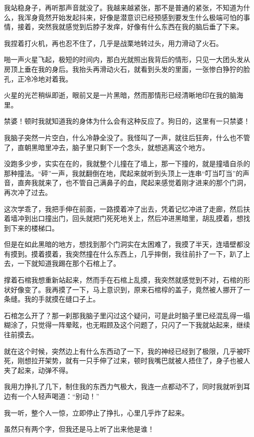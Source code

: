 我站稳身子，再听那声音就没了。我越来越紧张，那不是普通的紧张，不知道为什么，我浑身竟然开始发起抖来，好像是潜意识已经预感到要发生什么极端可怕的事情，接着，突然我就感觉到后脖子发痒，好像有什么东西在我的脑后垂了下来。

我捏着打火机，再也忍不住了，几乎是战栗地转过头，用力滑动了火石。

啪一声火星飞起，极短的时间内，那白光就照出我背后的情形，只见一大团头发从房顶上垂在我的身后。我抬头再滑动火石，就看到头发的里面，一张惨白狰狞的脸孔，正冷冷地对着我。

火星的光芒稍纵即逝，眼前又是一片黑暗，然而那情形已经清晰地印在我的脑海里。

禁婆！顿时我就知道我的身体为什么会有这种反应了。狗日的，这里有一只禁婆！

我脑子突然一片空白，什么冷静全没了。我怪叫了一声，就往后狂奔，什么也不管了，直朝黑暗里冲去，脑子里只剩下一个念头，就想逃离这个地方。

没跑多少步，实实在在的，我就整个儿撞在了墙上，那一下撞的，就是撞墙自杀的那种撞法。“砰”一声，我就翻倒在地，爬起来就听到头顶上一连串“叮当叮当”的声音，直奔我就来了，也不管自己满鼻子的血，爬起来感觉着刚才进来的那个门洞，再次冲了过去。

这次学乖了，我把手伸在前面，一路摸着冲了出去，凭着记忆冲进了走廊，然后扶着墙冲到出口撞出门，回头就把门死死地关上，然后冲进黑暗里，胡乱摸着，想找到下来的楼梯口。

但是在如此黑暗的地方，想找到那个门洞实在太困难了，我摸了半天，连墙壁都没有摸到。摸着摸着，我突然撞在什么东西上，几乎摔倒，我往前扑了一下，趴了上去，一下就知道我踢在那个石棺上了。

撑着石棺我想重新站起来，然而手在石棺上乱摸，我突然就感觉到不对，石棺的形状好像变了。我再摸了一下，马上意识到，原来石棺椁的盖子，竟然被人挪开了一条缝。我的手就摸在缝口子上。

石棺怎么开了？那一刹那我脑子里闪过这个疑问，可是此时脑子里已经混乱得一塌糊涂了，只觉得一阵晕眩，也无暇顾及这个问题了，只闪了一下我就站起来，继续往前摸去。

就在这个时候，突然边上有什么东西动了一下，我的神经已经到了极限，几乎被吓死，刚想拉开架势，就有一只手伸了过来，顿时我嘴巴就被人捂住了，身子也被人夹了起来，动弹不得。

我用力挣扎了几下，制住我的东西力气极大，我连一点都动不了，同时我就听到耳边有一个人轻声喝道：“别动！”

我一听，整个人一惊，立即停止了挣扎，心里几乎炸了起来。

虽然只有两个字，但我还是马上听了出来他是谁！

